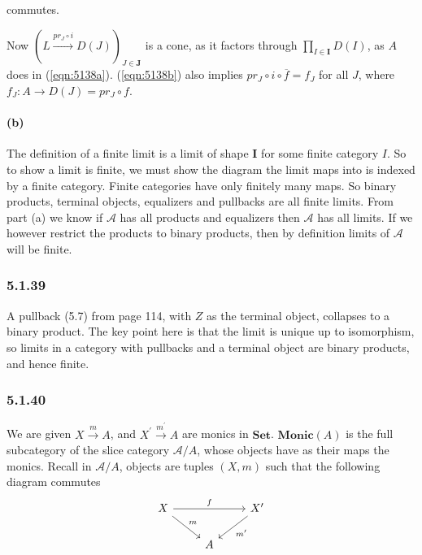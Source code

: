 \documentclass{article}
\begin{document}
commutes.

Now $(L \xrightarrow{pr_J \circ i} D(J))_{J \in \mathbf{J}}$ is a cone, as it factors through $\prod_{I \in \mathbf{I}}D(I)$, as $A$ does in (\ref{eqn:5138a}). (\ref{eqn:5138b}) also implies $pr_J \circ i \circ \overline{f} = f_J$ for all $J$, where $f_J \colon A \rightarrow D(J) = pr_J \circ f$.

\paragraph{(b)}

The definition of a finite limit is a limit of shape $\mathbf{I}$ for some finite category $I$. So to show a limit is finite, we must show the diagram the limit maps into is indexed by a finite category. Finite categories have only finitely many maps. So binary products, terminal objects, equalizers and pullbacks are all finite limits. From part (a) we know if $\mathcal{A}$ has all products and equalizers then $\mathcal{A}$ has all limits. If we however restrict the products to binary products, then by definition limits of $\mathcal{A}$ will be finite.

\subsubsection*{5.1.39}

A pullback (5.7) from page 114, with $Z$ as the terminal object, collapses to a binary product. The key point here is that the limit is unique up to isomorphism, so limits in a category with pullbacks and a terminal object are binary products, and hence finite.

\subsubsection*{5.1.40}

We are given $X \xrightarrow{m} A$, and $X^\prime \xrightarrow{m^\prime} A$ are monics in $\mathbf{Set}$. $\mathbf{Monic}(A)$ is the full subcategory of the slice category $\mathcal{A} / A$, whose objects have as their maps the monics. Recall in $\mathcal {A}/A$, objects are tuples $(X, m)$ such that the following diagram commutes
\begin{equation*}
\begin{tikzcd}
X \arrow{dr}{m} \arrow{rr}{f}
& & X^\prime \arrow{dl}{m^\prime} \\
& A
\end{tikzcd}
\end{equation*}
\end{document}
